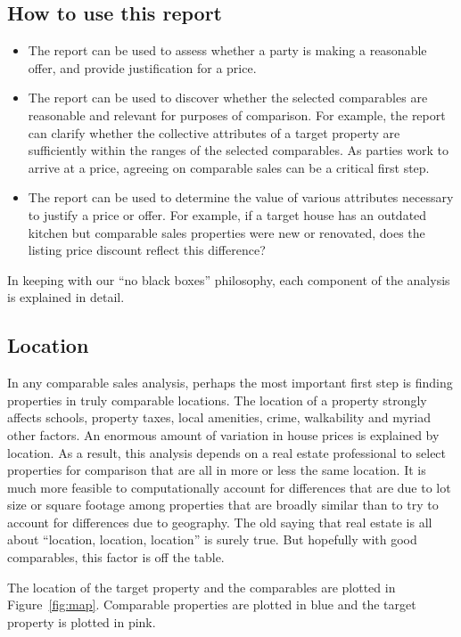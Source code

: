 \documentclass[
12pt, %
letterpaper, %
oneside, %
headinclude,footinclude, %
BCOR5mm, %
]{scrartcl}
\begin{document}
\subsection{How to use this report}
\begin{itemize}
\item The report can be used to assess whether a party is making a reasonable offer, and provide justification for a price. 
\item The report can be used to discover whether the selected comparables are reasonable and relevant for purposes of comparison. 
For example, the report can clarify whether the collective attributes of a target property are sufficiently within the ranges of the selected comparables. As parties work to arrive at a price, agreeing on comparable sales can be a critical first step. 
\item The report can be used to determine the value of various attributes necessary to justify a price or offer. For example, if a target house has an outdated kitchen but comparable sales properties were new or renovated, does the listing price discount reflect this difference? 
\end{itemize} 

In keeping with our ``no black boxes'' philosophy, each component of the analysis is explained in detail. 

\subsection{Location}
In any comparable sales analysis, perhaps the most important first step is finding properties in truly comparable locations.
The location of a property strongly affects schools, property taxes, local amenities, crime, walkability and myriad other factors.
An enormous amount of variation in house prices is explained by location. 
As a result, this analysis depends on a real estate professional to select properties for comparison that are all in more or less the same location.
It is much more feasible to computationally account for differences that are due to lot size or square footage among properties that are broadly similar than to try to account for differences due to geography. 
The old saying that real estate is all about ``location, location, location'' is surely true. But hopefully with good comparables, this factor is off the table.

The location of the target property and the comparables are plotted in Figure~\ref{fig:map}.
Comparable properties are plotted in blue and the target property is plotted in pink. 
\end{document}
